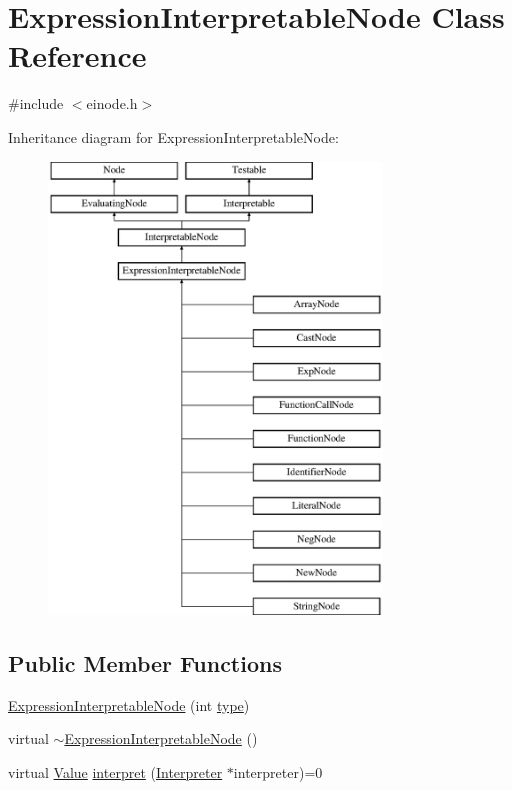 \hypertarget{classExpressionInterpretableNode}{}\section{Expression\+Interpretable\+Node Class Reference}
\label{classExpressionInterpretableNode}


{\ttfamily \#include $<$einode.\+h$>$}

Inheritance diagram for Expression\+Interpretable\+Node\+:\begin{figure}[H]
\begin{center}
\leavevmode
\includegraphics[height=12.000000cm]{classExpressionInterpretableNode}
\end{center}
\end{figure}
\subsection*{Public Member Functions}
\begin{DoxyCompactItemize}
\item 
\hyperlink{classExpressionInterpretableNode_ada38422992af67b30cca93c59bfce188}{Expression\+Interpretable\+Node} (int \hyperlink{classNode_af4f536b1b3f60e197fe364ba56022291}{type})
\item 
virtual \hyperlink{classExpressionInterpretableNode_a3774db564fad38ea68ca0edf235c97aa}{$\sim$\+Expression\+Interpretable\+Node} ()
\item 
virtual \hyperlink{classValue}{Value} \hyperlink{classExpressionInterpretableNode_a43650f046c48fc539f77a207e3c9181e}{interpret} (\hyperlink{classInterpreter}{Interpreter} $\ast$interpreter)=0
\end{DoxyCompactItemize}
